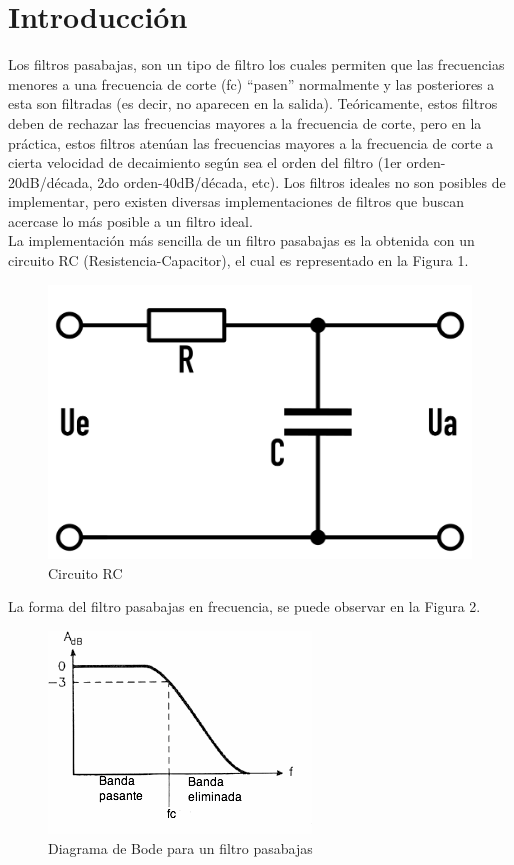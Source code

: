 \section{Introducción}
Los filtros pasabajas, son un tipo de filtro los cuales permiten que las frecuencias menores a una frecuencia de corte (fc) ``pasen'' normalmente y las posteriores a esta son filtradas (es decir, no aparecen en la salida). Teóricamente, estos filtros deben de rechazar las frecuencias mayores a la frecuencia de corte, pero en la práctica, estos filtros atenúan las frecuencias mayores a la frecuencia de corte a cierta velocidad de decaimiento según sea el orden del filtro (1er orden-20dB/década, 2do orden-40dB/década, etc). Los filtros ideales no son posibles de implementar, pero existen diversas implementaciones de filtros que buscan acercase lo más posible a un filtro ideal.\\ La implementación más sencilla de un filtro pasabajas es la obtenida con un circuito RC (Resistencia-Capacitor), el cual es representado en la Figura 1.
\begin{figure}[H]
	\centering
	\includegraphics[scale=.14]{img/rc.png}
	\caption{Circuito RC}
	\label{fig:CircuitoRC}		
\end{figure}
La forma del filtro pasabajas en frecuencia, se puede observar en la Figura 2.
\begin{figure}[H]
	\centering
	\includegraphics[scale=.9]{img/filtro.png}
	\caption{Diagrama de Bode para un filtro pasabajas}
	\label{fig:FrecuenciaRC}		
\end{figure}
